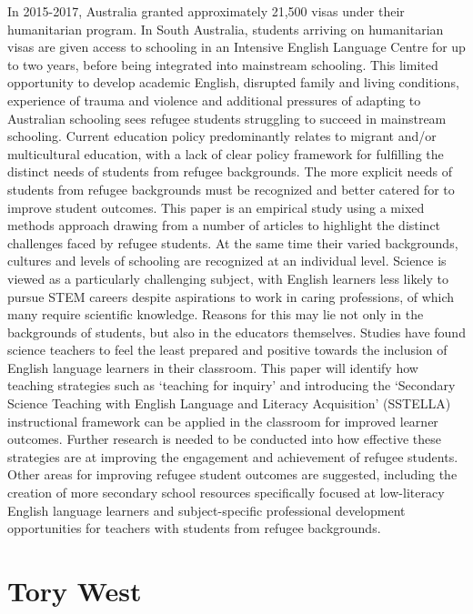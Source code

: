 \documentclass[twoside,12pt,a4paper,notitlepage]{memoir}
\begin{document}
In 2015-2017, Australia granted approximately 21,500 visas under their humanitarian program. In South Australia, students arriving on humanitarian visas are given access to schooling in an Intensive English Language Centre for up to two years, before being integrated into mainstream schooling. This limited opportunity to develop academic English, disrupted family and living conditions, experience of trauma and violence and additional pressures of adapting to Australian schooling sees refugee students struggling to succeed in mainstream schooling.
Current education policy predominantly relates to migrant and/or multicultural education, with a lack of clear policy framework for fulfilling the distinct needs of students from refugee backgrounds. The more explicit needs of students from refugee backgrounds must be recognized and better catered for to improve student outcomes.
This paper is an empirical study using a mixed methods approach drawing from a number of articles to highlight the distinct challenges faced by refugee students. At the same time their varied backgrounds, cultures and levels of schooling are recognized at an individual level.
Science is viewed as a particularly challenging subject, with English learners less likely to pursue STEM careers despite aspirations to work in caring professions, of which many require scientific knowledge. Reasons for this may lie not only in the backgrounds of students, but also in the educators themselves. Studies have found science teachers to feel the least prepared and positive towards the inclusion of English language learners in their classroom. This paper will identify how teaching strategies such as ‘teaching for inquiry’ and introducing the ‘Secondary Science Teaching with English Language and Literacy Acquisition’ (SSTELLA) instructional framework can be applied in the classroom for improved learner outcomes. Further research is needed to be conducted into how effective these strategies are at improving the engagement and achievement of refugee students. Other areas for improving refugee student outcomes are suggested, including the creation of more secondary school resources specifically focused at low-literacy English language learners and subject-specific professional development opportunities for teachers with students from refugee backgrounds.

\section*{Tory West}
\end{document}
